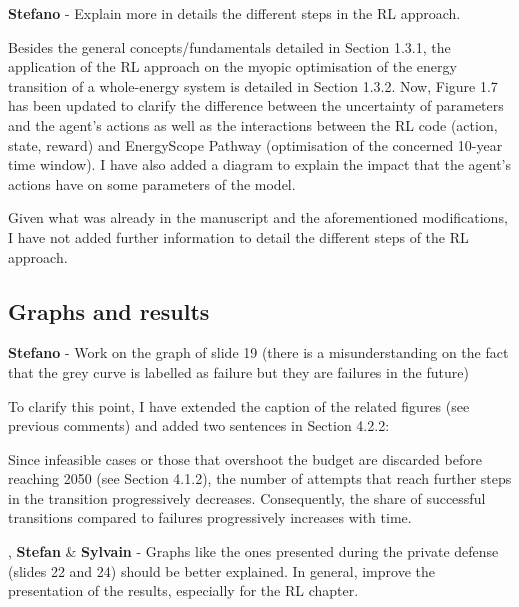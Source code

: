 \documentclass[12pt,a4paper]{article}
\begin{document}
\begin{mdframed}[style=comment] %
{\color{orange} \textbf{Stefano}} - Explain more in details the different steps in the RL approach.
\end{mdframed}

\noindent Besides the general concepts/fundamentals detailed in Section 1.3.1, the application of the RL approach on the myopic optimisation of the energy transition of a whole-energy system is detailed in Section 1.3.2. Now, Figure 1.7 has been updated to clarify the difference between the uncertainty of parameters and the agent's actions as well as the interactions between the RL code (action, state, reward) and EnergyScope Pathway (optimisation of the concerned 10-year time window). I have also added a diagram to explain the impact that the agent's actions have on some parameters of the model. 

Given what was already in the manuscript and the aforementioned modifications, I have not added further information to detail the different steps of the RL approach.


\subsection{Graphs and results}

\begin{mdframed}[style=comment] %
{\color{orange} \textbf{Stefano}} - Work on the graph of slide 19 (there is a misunderstanding on the fact that the grey curve is labelled as failure but they are failures in the future)
\end{mdframed}

\noindent To clarify this point, I have extended the caption of the related figures (see previous comments) and added two sentences in {\color{blue} Section 4.2.2}:

\begin{mdframed}[style=manuscript] %
Since infeasible cases or those that overshoot the  budget are discarded before reaching 2050 (see Section 4.1.2), the number of attempts that reach further steps in the transition progressively decreases. Consequently, the share of successful transitions compared to failures progressively increases with time. 
\end{mdframed}

\begin{mdframed}[style=comment] %
, {\color{teal} \textbf{Stefan}} \& {\color{purple} \textbf{Sylvain}} - Graphs like the ones presented during the private defense (slides 22 and 24) should be better explained. In general, improve the presentation of the results, especially for the RL chapter.
\end{mdframed}
\end{document}
